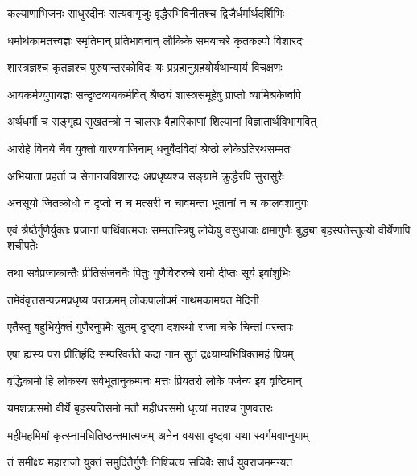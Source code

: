 \twolineshloka
{कल्याणाभिजनः साधुरदीनः सत्यवागृजुः}
{वृद्धैरभिविनीतश्च द्विजैर्धर्मार्थदर्शिभिः} %

\twolineshloka
{धर्मार्थकामतत्त्वज्ञः स्मृतिमान् प्रतिभावनान्}
{लौकिके समयाचरे कृतकल्पो विशारदः} %

\twolineshloka
{शास्त्रज्ञश्च कृतज्ञश्च पुरुषान्तरकोविदः}
{यः प्रग्रहानुग्रहयोर्यथान्यायं विचक्षणः} %

\twolineshloka
{आयकर्मण्युपायज्ञः सन्दृष्टव्ययकर्मवित्}
{श्रैष्ठ्यं शास्त्रसमूहेषु प्राप्तो व्यामिश्रकेष्वपि} %

\twolineshloka
{अर्थधर्मौ च सङ्गृह्य सुखतन्त्रो न चालसः}
{वैहारिकाणां शिल्पानां विज्ञातार्थविभागवित्} %

\twolineshloka
{आरोहे विनये चैव युक्तो वारणवाजिनाम्}
{धनुर्वेदविदां श्रेष्ठो लोकेऽतिरथसम्मतः} %

\twolineshloka
{अभियाता प्रहर्ता च सेनानयविशारदः}
{अप्रधृष्यश्च सङ्ग्रामे क्रुद्धैरपि सुरासुरैः} %

\twolineshloka
{अनसूयो जितक्रोधो न दृप्तो न च मत्सरी}
{न चावमन्ता भूतानां न च कालवशानुगः} %

\threelineshloka
{एवं श्रैष्ठैर्गुणैर्युक्तः प्रजानां पार्थिवात्मजः}
{सम्मतस्त्रिषु लोकेषु वसुधायाः क्षमागुणैः}
{बुद्ध्या बृहस्पतेस्तुल्यो वीर्येणापि शचीपतेः} %

\twolineshloka
{तथा सर्वप्रजाकान्तैः प्रीतिसंजननैः पितुः}
{गुणैर्विरुरुचे रामो दीप्तः सूर्य इवांशुभिः} %

\twolineshloka
{तमेवंवृत्तसम्पन्नमप्रधृष्य पराक्रमम्}
{लोकपालोपमं नाथमकामयत मेदिनी} %

\twolineshloka
{एतैस्तु बहुभिर्युक्तं गुणैरनुपमैः सुतम्}
{दृष्ट्वा दशरथो राजा चक्रे चिन्तां परन्तपः} %

\twolineshloka
{एषा ह्यस्य परा प्रीतिर्हृदि सम्परिवर्तते}
{कदा नाम सुतं द्रक्ष्याम्यभिषिक्तमहं प्रियम्} %

\twolineshloka
{वृद्धिकामो हि लोकस्य सर्वभूतानुकम्पनः}
{मत्तः प्रियतरो लोके पर्जन्य इव वृष्टिमान्} %

\twolineshloka
{यमशक्रसमो वीर्ये बृहस्पतिसमो मतौ}
{महीधरसमो धृत्यां मत्तश्च गुणवत्तरः} %

\twolineshloka
{महीमहमिमां कृत्स्नामधितिष्ठन्तमात्मजम्}
{अनेन वयसा दृष्ट्वा यथा स्वर्गमवाप्नुयाम्} %

\twolineshloka
{तं समीक्ष्य महाराजो युक्तं समुदितैर्गुणैः}
{निश्चित्य सचिवैः सार्धं युवराजममन्यत} %

